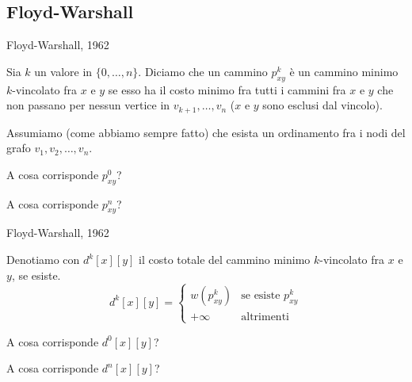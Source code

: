 \subsection{Floyd-Warshall}

\vspace{-9pt}
\begin{frame}{Floyd-Warshall, 1962}

\begin{myboxtitle}
Sia $k$ un valore in $\{0,\ldots,n\}$. Diciamo che un cammino 
$p_{xy}^k$ è un \alert{cammino minimo $k$-vincolato} fra $x$ e $y$ 
se esso ha il costo minimo fra tutti i cammini fra $x$ e $y$ 
che non passano per nessun vertice in $v_{k+1}, \ldots, v_n$
($x$ e $y$ sono esclusi dal vincolo).
\end{myboxtitle}

\begin{myboxtitle}[Note]
Assumiamo (come abbiamo sempre fatto) che esista un ordinamento fra i nodi
del grafo $v_1, v_2, \ldots, v_n$.
\end{myboxtitle}

\begin{myboxtitle}[Domande]
\BI
\item A cosa corrisponde $p^0_{xy}$?
\item A cosa corrisponde $p^n_{xy}$?
\EI
\end{myboxtitle}

\end{frame}

\begin{frame}{Floyd-Warshall, 1962}

\vspace{-9pt}
\begin{myboxtitle}
Denotiamo con $d^k[x][y]$ il costo totale del cammino minimo $k$-vincolato
fra $x$ e $y$, se esiste.
\[
  d^k[x][y] = \begin{cases}
    w(p_{xy}^k) & \textrm{se esiste $p_{xy}^k$}\\
    +\infty & \textrm{altrimenti}
  \end{cases}
\]
\end{myboxtitle}

\begin{myboxtitle}[Domande]
\BIL
\item A cosa corrisponde $d^0[x][y]$?
\item A cosa corrisponde $d^n[x][y]$?
\EIL
\end{myboxtitle}

\end{frame}


